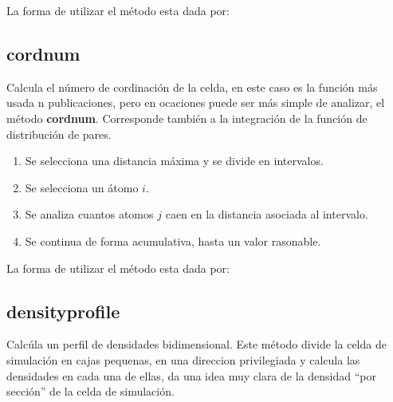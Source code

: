 La forma de utilizar el m\'etodo esta dada por:


\subsection{cordnum}
Calcula el n\'umero de cordinaci\'on de la celda, en este caso es la funci\'on
m\'as usada n publicaciones, pero en ocaciones puede ser m\'as simple de
analizar, el m\'etodo \textbf{cordnum}. Corresponde tambi\'en a la integraci\'on
de la funci\'on de distribuci\'on de pares.
\begin{enumerate}
 \item Se selecciona una distancia m\'axima y se divide en intervalos.
 \item Se selecciona un \'atomo $i$.
 \item Se analiza cuantos atomos $j$ caen en la distancia asociada al intervalo.
 \item Se continua de forma acumulativa, hasta un valor rasonable.
\end{enumerate}

La forma de utilizar el m\'etodo esta dada por:


\subsection{densityprofile}
Calc\'ula un perfil de densidades bidimensional. Este m\'etodo divide la celda
de simulaci\'on en cajas pequenas, en una direccion privilegiada y calcula las
densidades en cada una de ellas, da una idea muy clara de la densidad ``por
secci\'on'' de la celda de simulaci\'on.

